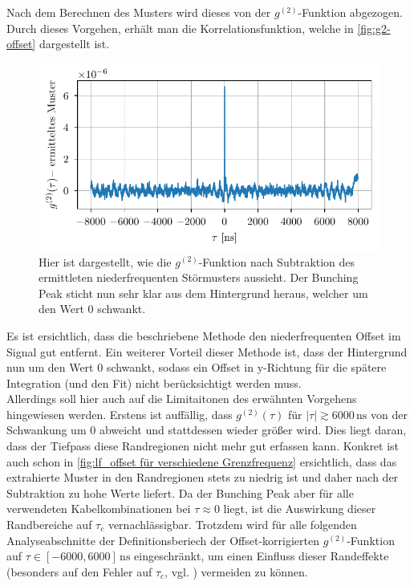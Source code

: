 Nach dem Berechnen des Musters wird dieses von der $g^{(2)}$-Funktion abgezogen. 
Durch dieses Vorgehen, erhält man die Korrelationsfunktion, welche in \autoref{fig:g2-offset} dargestellt ist.
\begin{figure}[h]
    \centering
    \includegraphics{images/Analysis/g2-lf_offset.pdf}
    \caption{Hier ist dargestellt, wie die $g^{(2)}$-Funktion nach Subtraktion des ermittleten niederfrequenten Störmusters aussieht. Der Bunching Peak sticht nun sehr klar aus dem Hintergrund heraus, welcher um den Wert 0 schwankt.}
    \label{fig:g2-offset}
\end{figure}
Es ist ersichtlich, dass die beschriebene Methode den niederfrequenten Offset im Signal gut entfernt. 
Ein weiterer Vorteil dieser Methode ist, dass der Hintergrund nun um den Wert 0 schwankt, sodass ein Offset in y-Richtung für die spätere Integration (und den Fit) nicht berücksichtigt werden muss. \\
Allerdings soll hier auch auf die Limitaitonen des erwähnten Vorgehens hingewiesen werden. 
Erstens ist auffällig, dass $g^{(2)}(\tau)$ für $|\tau|\gtrsim 6000\,\mathrm{ns}$ von der Schwankung um 0 abweicht und stattdessen wieder größer wird. 
Dies liegt daran, dass der Tiefpass diese Randregionen nicht mehr gut erfassen kann. 
Konkret ist auch schon in \autoref{fig:lf_offset für verschiedene Grenzfrequenz} ersichtlich, dass das extrahierte Muster in den Randregionen stets zu niedrig ist und daher nach der Subtraktion zu hohe Werte liefert. 
Da der Bunching Peak aber für alle verwendeten Kabelkombinationen bei $\tau\approx 0$ liegt, ist die Auswirkung dieser Randbereiche auf $\tau_c$ vernachlässigbar. 
Trotzdem wird für alle folgenden Analyseabschnitte der Definitionsberiech der Offset-korrigierten $g^{(2)}$-Funktion auf $\tau\in[-6000,6000]\,\mathrm{ns}$ eingeschränkt, um einen Einfluss dieser Randeffekte (besonders auf den Fehler auf $\tau_c$, vgl. ) vermeiden zu können. 
